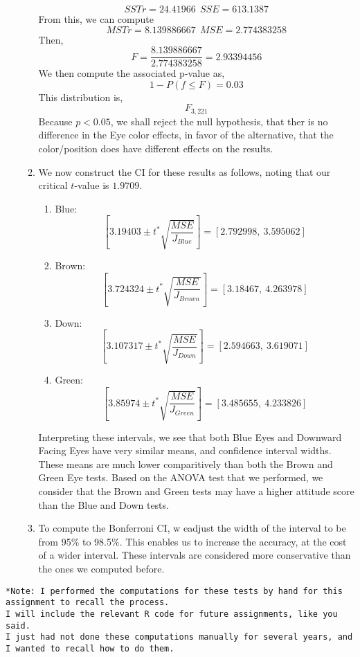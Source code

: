 \documentclass[letterpaper,10pt]{article}
\begin{document}
\begin{enumerate}
\begin{enumerate}
\[SSTr=24.41966\ \ SSE=613.1387\]
From this, we can compute
\[MSTr=8.139886667\ \ MSE=2.774383258\]
Then,
\[F=\frac{8.139886667}{2.774383258}=2.93394456\]
We then compute the associated p-value as,
\[1-P(f\leq F)=0.03\]
This distribution is,
\[F_{3,221}\]
Because $p<0.05$, we shall reject the null hypothesis, that ther is no difference in the Eye color effects, in favor of the alternative, that the color/position does have different effects on the results.
\item We now construct the CI for these results as follows, noting that our critical $t$-value is $1.9709$.
\begin{enumerate}
\item Blue:
\[[3.19403\pm t^* \sqrt{\frac{MSE}{J_{Blue}}}]=[2.792998,\ 3.595062]\]
\item Brown:
\[[3.724324\pm t^* \sqrt{\frac{MSE}{J_{Brown}}}]=[3.18467,\ 4.263978]\]
\item Down:
\[[3.107317\pm t^* \sqrt{\frac{MSE}{J_{Down}}}]=[2.594663,\ 3.619071]\]
\item Green:
\[[3.85974\pm t^* \sqrt{\frac{MSE}{J_{Green}}}]=[3.485655,\ 4.233826]\]
\end{enumerate}
Interpreting these intervals, we see that both Blue Eyes and Downward Facing Eyes have very similar means, and confidence interval widths. These means are much lower comparitively than both the Brown and Green Eye tests. Based on the ANOVA test that we performed, we consider that the Brown and Green tests may have a higher attitude score than the Blue and Down tests.
\item To compute the Bonferroni CI, w eadjust the width of the interval to be from 95\% to 98.5\%. This enables us to increase the accuracy, at the cost of a wider interval. These intervals are considered more conservative than the ones we computed before.
\end{enumerate}
\end{enumerate}
\begin{verbatim}
*Note: I performed the computations for these tests by hand for this assignment to recall the process.
I will include the relevant R code for future assignments, like you said. 
I just had not done these computations manually for several years, and I wanted to recall how to do them.
\end{verbatim}
\end{document}
